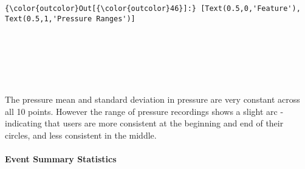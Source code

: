 \documentclass[11pt]{article}
\begin{document}
\begin{Verbatim}[commandchars=\\\{\}]
{\color{outcolor}Out[{\color{outcolor}46}]:} [Text(0.5,0,'Feature'), Text(0.5,1,'Pressure Ranges')]
\end{Verbatim}
            
    \begin{center}
    \end{center}
    { \hspace*{\fill} \\}
    
    \begin{center}
    \end{center}
    { \hspace*{\fill} \\}
    
    \begin{center}
    \end{center}
    { \hspace*{\fill} \\}
    
    The pressure mean and standard deviation in pressure are very constant
across all 10 points. However the range of pressure recordings shows a
slight arc - indicating that users are more consistent at the beginning
and end of their circles, and less consistent in the middle.

    \hypertarget{event-summary-statistics}{%
\paragraph{Event Summary Statistics}\label{event-summary-statistics}}
\end{document}
